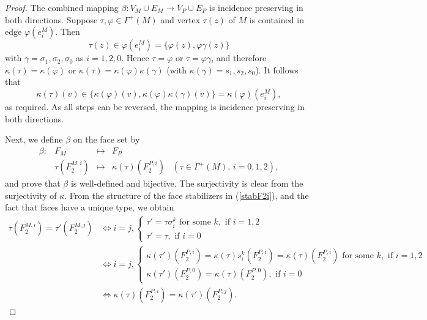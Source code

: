 \documentclass[12pt]{article}
\theoremstyle{definition}\newtheorem{definition}{Definition}[section]
\begin{document}
\begin{proof}
The combined mapping $\beta:V_M \cup E_M \rightarrow V_P \cup E_P$ is incidence preserving in both directions. Suppose $\tau,\varphi\in \Gamma^+(M)$ and vertex $\tau(z)$ of $M$ is contained in edge $\varphi(e_i^M)$. Then 
$$\tau(z) \in \varphi(e_i^M) = \{\varphi(z), \varphi \gamma(z)\}$$ 
with $\gamma = \sigma_1, \sigma_2, \sigma_0$ as $i=1,2,0$. Hence $\tau = \varphi$ or $\tau = \varphi\gamma$, and therefore $\kappa(\tau) = \kappa(\varphi)$ or $\kappa(\tau) = \kappa(\varphi)\kappa(\gamma)$ (with $\kappa(\gamma) = s_1, s_2, s_0$). It follows that 
$$\kappa(\tau)(v)\in \{\kappa(\varphi)(v), \kappa(\varphi)\kappa(\gamma)(v)\} = \kappa(\varphi)(e_i^M),$$ as required. As all steps can be reversed, the mapping is incidence preserving in both directions. \smallskip

Next, we define $\beta$ on the face set by
$$\begin{array}{rlcl}
\beta:& F_M& \mapsto& F_P\\
&\tau(F_2^{M,i})& \mapsto& \kappa(\tau)(F_2^{P,i}) \;\;\; (\tau\in \Gamma^+(M),\, i=0,1,2),
\end{array}$$
and prove that $\beta$ is well-defined and bijective. The surjectivity is clear from the surjectivity of $\kappa$. From the structure of the face stabilizers in (\ref{stabF2i}), and the fact that faces have a unique type, we obtain  
\begin{equation}
    \begin{aligned}\nonumber
        \tau(F_2^{M,i}) = \tau'(F_2^{M,j}) \!&\!\iff\!\! i=j,
        \begin{cases}
            \tau'=\tau\sigma_i^k \text { for some } k, \text{ if } i=1,2 \\
            \tau' = \tau, \text{ if } i=0
        \end{cases} \\[.03in]
        \!&\!\iff\!\! i=j, \begin{cases}
            \kappa(\tau')(F_2^{P,i}) = \kappa(\tau)s_i^k(F_2^{P,i}) = \kappa(\tau)(F_2^{P,i}) 
                                    \text{ for some } k, \text{ if } i=1,2 \\
            \kappa(\tau')(F_2^{P,0}) = \kappa(\tau)(F_2^{P,0}), \text{ if } i=0
        \end{cases} \\[.03in]     
        \!&\!\iff\!\!\kappa(\tau)(F_2^{P,i}) = \kappa(\tau')(F_2^{P,j}) .
    \end{aligned}
\end{equation}
\smallskip


\end{proof}
\end{document}
